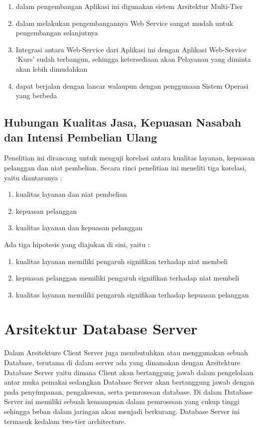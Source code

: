 \begin{enumerate}
    \item dalam pengembangan Aplikasi ini digunakan sistem Arsitektur Multi-Tier
    \item dalam melakukan pengembangannya Web Service sangat mudah untuk pengembangan selanjutnya
    \item Integrasi antara Web-Service dari Aplikasi ini dengan Aplikasi Web-Service `Kurs' sudah terbangun, sehingga ketersediaan akan Pelayanan yang diminta akan lebih dimudahkan
    \item dapat berjalan dengan lancar walaupun dengan penggunaan Sistem Operasi yang berbeda
\end{enumerate}

\subsection{Hubungan Kualitas Jasa, Kepuasan Nasabah dan Intensi Pembelian Ulang}
Penelitian ini dirancang untuk menguji korelasi antara kualitas layanan, kepuasan pelanggan dan niat pembelian. Secara rinci penelitian 
ini meneliti tiga korelasi, yaitu diantaranya :

\begin{enumerate}
\item kualitas layanan dan niat pembelian  
\item kepuasan pelanggan
\item kualitas layanan dan kepuasan pelanggan
\end{enumerate}

Ada tiga hipotesis yang diajukan di sini, yaitu :
\begin{enumerate}
\item kualitas layanan memiliki pengaruh signifikan terhadap niat membeli 
\item kepuasan pelanggan memiliki pengaruh signifikan terhadap niat membeli
\item kualitas layanan memiliki pengaruh signifikan terhadap kepuasan pelanggan 
\end{enumerate}

\section{Arsitektur Database Server}
Dalam Arsitekture Client Server juga membutuhkan atau menggunakan sebuah Database, terutama di dalam server ada yang
dinamakan dengan Arsitekture Database Server yaitu dimana Client akan bertanggung jawab dalam pengelolaan antar muka pemakai
sedangkan Database Server akan bertanggung jawab dengan pada penyimpanan, pengaksesan, serta pemrosesan database.
Di dalam Database Server ini memiliki sebuah kemampuan dalam pemrosesan yang cukup tinggi sehingga beban dalam jaringan akan 
menjadi berkurang. Database Server ini termasuk kedalam two-tier architecture.

